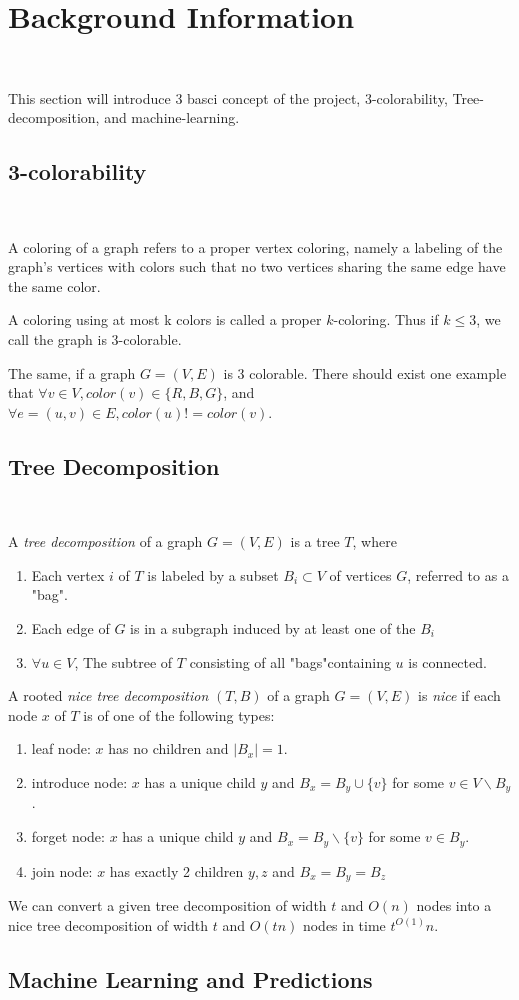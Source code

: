 \section{Background Information}~\label{sec.background}

This section will introduce 3 basci concept of the project, 3-colorability, Tree-decomposition, and machine-learning.

\subsection{3-colorability}~\label{sec.subbackground1}

A coloring of a graph refers to a proper vertex coloring, namely a labeling of the graph's vertices with colors such that no two vertices sharing the same edge have the same color.

A coloring using at most k colors is called a proper $k$-coloring. Thus if $k\le 3$, we call the graph is 3-colorable.

The same, if a graph $G=(V, E)$ is 3 colorable. There should exist one example that $\forall v \in V, color(v) \in \{R, B, G\}$, and $\forall e = (u, v) \in E, color(u) != color(v)$.

\subsection{Tree Decomposition}~\label{sec.subbackground2}

A \textit{tree decomposition} of a graph $G=(V, E)$ is a tree $T$, where

\begin{enumerate}
    \item Each vertex $i$ of $T$ is labeled by a subset $B_{i} \subset V$ of vertices $G$, referred to as a "bag".
    \item Each edge of $G$ is in a subgraph induced by at least one of the $B_{i}$
    \item $\forall u \in V$, The subtree of $T$ consisting of all "bags"containing $u$ is connected.
\end{enumerate}

A rooted \textit{nice tree decomposition} $(T, B)$ of a graph $G=(V, E)$ is \textit{nice} if each node $x$ of $T$ is of one of the following types:

\begin{enumerate}
    \item leaf node: $x$ has no children and $|B_{x}| = 1$.
    \item introduce node: $x$ has a unique child $y$ and $B_{x}=B_{y}\cup\{v\}$ for some $v \in V \backslash B_{y}$.
    \item forget node: $x$ has a unique child $y$ and $B_{x}=B_{y}\backslash\{v\}$ for some $v \in B_{y}$.
    \item join node: $x$ has exactly 2 children $y, z$ and $B_{x}=B_{y}=B_{z}$
\end{enumerate}

We can convert a given tree decomposition of width $t$ and $O(n)$ nodes into a nice
tree decomposition of width $t$ and $O(tn)$ nodes in time $t^{O(1)}n$\cite{FasterTD2019}.

\subsection{Machine Learning and Predictions}